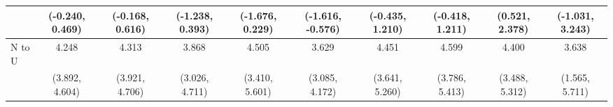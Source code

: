 {\begin{tabular}{l|c|c|c|c|c|c|c|c|c}
& {\scriptsize (-0.240, 0.469)}
& {\scriptsize (-0.168, 0.616)}
& {\scriptsize (-1.238, 0.393)}
& {\scriptsize (-1.676, 0.229)}
& {\scriptsize (-1.616, -0.576)}
& {\scriptsize (-0.435, 1.210)}
& {\scriptsize (-0.418, 1.211)}
& {\scriptsize (0.521, 2.378)}
& {\scriptsize (-1.031, 3.243)}
\\ [0.1cm]
\hline
N to U
& 4.248 & 4.313 & 3.868 & 4.505 & 3.629 & 4.451 & 4.599 & 4.400 & 3.638 \\
& {\scriptsize (3.892, 4.604)}
& {\scriptsize (3.921, 4.706)}
& {\scriptsize (3.026, 4.711)}
& {\scriptsize (3.410, 5.601)}
& {\scriptsize (3.085, 4.172)}
& {\scriptsize (3.641, 5.260)}
& {\scriptsize (3.786, 5.413)}
& {\scriptsize (3.488, 5.312)}
& {\scriptsize (1.565, 5.711)}
\\ [0.1cm]
\hline
\hline
\end{tabular}
}

